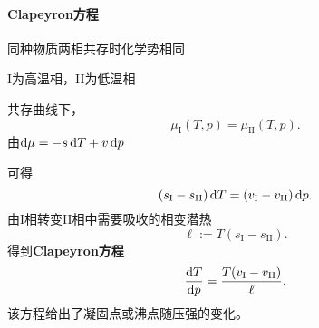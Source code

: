 \paragraph*{Clapeyron方程}
同种物质两相共存时化学势相同
\begin{center}
	\tikzchap   I为高温相，II为低温相
\end{center}
共存曲线下，
\[\mu_\mathrm I(T,p)=\mu_\mathrm{II}(T,p).\]
由$\mathop{}\!\mathrm{d}\mu=-s\mathop{}\!\mathrm{d} T+v\mathop{}\!\mathrm{d} p$
\iffalse
	故
	\[\pv{\mu_\mathrm I}T\d T+\pv{\mu_\mathrm I}p\d p=\pv{\mu_\mathrm{II}}T\d T+\pv{\mu_\mathrm{II}}p\d p.\]
	由Gibbs自由能给出Maxwell关系
	\begin{align*}
		\pw GTN=\pw GNT & \thus\kh{\pv\mu{T}}_N=-\kh{\pv SN}_T=-s, \\
		\pw GpN=\pw GNp & \thus\kh{\pv\mu{p}}_N=\kh{\pv VN}_p=v.
	\end{align*}
\fi
可得
\[\left(s_\mathrm I-s_\mathrm{II}\right)\mathop{}\!\mathrm{d} T=\left(v_\mathrm I-v_\mathrm{II}\right)\mathop{}\!\mathrm{d} p.\]
由I相转变II相中需要吸收的相变潜热
\[\ell:=T(s_\mathrm I-s_\mathrm{II}).\]
得到\textbf{Clapeyron方程}
\begin{align}
	\frac{\mathrm{d}^{\;\!\!}T}{\mathrm{d} p^{\;\!\!}}=\frac{T(v_\mathrm I-v_\mathrm{II})}\ell.
\end{align}
该方程给出了凝固点或沸点随压强的变化。
